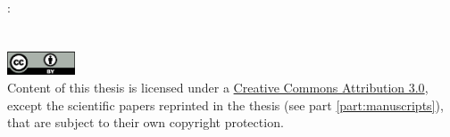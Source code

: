 \thispagestyle{empty}

\hfill

\vfill

\noindent\myName:\\[2pt]
\textit{\myTitle}\\[-3.5pt]{\small\mySubtitle}\\[4pt]%
\includegraphics[width=2cm]{gfx/cc_by__Logo.eps}\\[-2.5pt]
{\footnotesize Content of this thesis is licensed under a \href{https://creativecommons.org/licenses/by/3.0/}{Creative Commons Attribution 3.0},
  except the scientific papers reprinted in the thesis (see part \ref{part:manuscripts}),
  that are subject to their own copyright protection.
}


